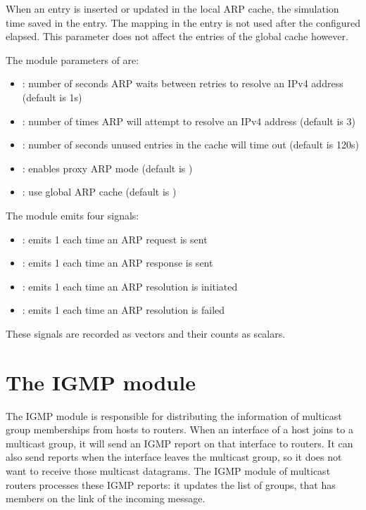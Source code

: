 When an entry is inserted or updated in the local ARP cache,
the simulation time saved in the entry. The mapping in the
entry is not used after the configured 
elapsed. This parameter does not affect the entries of
the global cache however.


The module parameters of  are:

\begin{itemize}
  \item {}: number of seconds ARP waits between retries to resolve an IPv4 address (default is 1s)
  \item {}: number of times ARP will attempt to resolve an IPv4 address (default is 3)
  \item {}: number of seconds unused entries in the cache will time out (default is 120s)
  \item {}: enables proxy ARP mode (default is )
  \item {}: use global ARP cache (default is )
\end{itemize}

The  module emits four signals:

\begin{itemize}
  \item {}: emits 1 each time an ARP request is sent
  \item {}: emits 1 each time an ARP response is sent
  \item {}: emits 1 each time an ARP resolution is initiated 
  \item {}: emits 1 each time an ARP resolution is failed
\end{itemize}

These signals are recorded as vectors and their counts as scalars.


\section{The IGMP module}

The IGMP module is responsible for distributing the information of
multicast group memberships from hosts to routers. When an interface
of a host joins to a multicast group, it will send an IGMP report
on that interface to routers. It can also send reports when the
interface leaves the multicast group, so it does not want to
receive those multicast datagrams. The IGMP module of multicast
routers processes these IGMP reports: it updates the list of
groups, that has members on the link of the incoming message.

